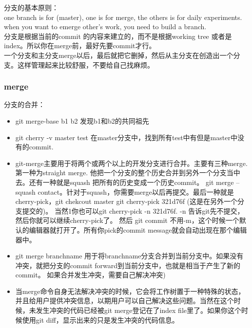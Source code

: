 \documentclass[a4paper,12pt,twoside]{book}
\begin{document}
\begin{CJK*}{UTF8}{song}
分支的基本原则：\\
one branch is for (master), one is for merge, the others is for daily experiments. when you want to emerge other's work, you need to build a branch.\\

分支是根据当前的commit 的内容来建立的，而不是根据working tree 或者是index。所以你在merge前，最好先要commit才行。\\

一个分支和主分支merge以后，最后就把它删掉，然后从主分支在创造出一个分支。这样管理起来比较舒服，不要给自己找麻烦。\\

\subsubsection{merge}
分支的合并：\\
\begin{itemize}
\item git merge-base b1 b2 发现b1和b2的共同祖先
\item git cherry -v master test 在master分支中，找到所有test中有但是master中没有的commit.
\item git-merge主要用于将两个或两个以上的开发分支进行合并。主要有三种merge.第一种为straight merge. 他把一个分支的整个历史合并到另外一个分支当中去。还有一种就是squash 把所有的历史变成一个历史commit。 git merge --squash contact。针对于squash，你需要merge以后再提交。最后一种就是cherry-pick，git chekcout master git cherry-pick 321d76f (这是在另外一个分支提交的)。 当然1你也可以git cherry-pick -n 321d76f. -n 告诉git先不提交，然后你就可以继续cherry-pick了。 然后 git commit 不用-m，这个时候一个默认的编辑器就打开了。所有你pick的commit message就会自动出现在那个编辑器中。

\item git merge branchname 用于将branchname分支合并到当前分支中。如果没有冲突，就把分支的commit forward到当前分支中，也就是相当于产生了新的commit。 如果合并发生冲突，需要自己解决冲突)

\item 当merge命令自身无法解决冲突的时候，它会将工作树置于一种特殊的状态，并且给用户提供冲突信息，以期用户可以自己解决这些问题。当然在这个时候，未发生冲突的代码已经被git merge登记在了index file里了。如果你这个时候使用git diff，显示出来的只是发生冲突的代码信息。


\end{itemize}
\end{CJK*}
\end{document}
